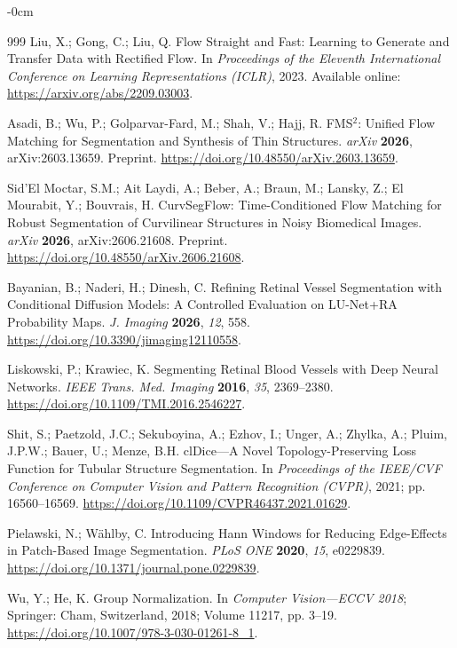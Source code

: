 \documentclass[jimaging,article,submit,pdftex,moreauthors]{Definitions/mdpi}
\begin{document}
\begin{adjustwidth}{-\extralength}{0cm}
\begin{thebibliography}{999}
Liu, X.; Gong, C.; Liu, Q.
Flow Straight and Fast: Learning to Generate and Transfer Data with Rectified Flow.
In \textit{Proceedings of the Eleventh International Conference on Learning Representations (ICLR)}, 2023.
Available online: \url{https://arxiv.org/abs/2209.03003}.

Asadi, B.; Wu, P.; Golparvar-Fard, M.; Shah, V.; Hajj, R.
FMS$^2$: Unified Flow Matching for Segmentation and Synthesis of Thin Structures.
\textit{arXiv} \textbf{2026}, arXiv:2603.13659. Preprint.
\url{https://doi.org/10.48550/arXiv.2603.13659}.

Sid'El Moctar, S.M.; Ait Laydi, A.; Beber, A.; Braun, M.; Lansky, Z.; El Mourabit, Y.; Bouvrais, H.
CurvSegFlow: Time-Conditioned Flow Matching for Robust Segmentation of Curvilinear Structures in Noisy Biomedical Images.
\textit{arXiv} \textbf{2026}, arXiv:2606.21608. Preprint.
\url{https://doi.org/10.48550/arXiv.2606.21608}.

Bayanian, B.; Naderi, H.; Dinesh, C.
Refining Retinal Vessel Segmentation with Conditional Diffusion Models: A Controlled Evaluation on LU-Net+RA Probability Maps.
\textit{J. Imaging} \textbf{2026}, \textit{12}, 558.
\url{https://doi.org/10.3390/jimaging12110558}.

Liskowski, P.; Krawiec, K.
Segmenting Retinal Blood Vessels with Deep Neural Networks.
\textit{IEEE Trans. Med. Imaging} \textbf{2016}, \textit{35}, 2369--2380.
\url{https://doi.org/10.1109/TMI.2016.2546227}.

Shit, S.; Paetzold, J.C.; Sekuboyina, A.; Ezhov, I.; Unger, A.; Zhylka, A.; Pluim, J.P.W.; Bauer, U.; Menze, B.H.
clDice---A Novel Topology-Preserving Loss Function for Tubular Structure Segmentation.
In \textit{Proceedings of the IEEE/CVF Conference on Computer Vision and Pattern Recognition (CVPR)}, 2021; pp. 16560--16569.
\url{https://doi.org/10.1109/CVPR46437.2021.01629}.

Pielawski, N.; W\"ahlby, C.
Introducing Hann Windows for Reducing Edge-Effects in Patch-Based Image Segmentation.
\textit{PLoS ONE} \textbf{2020}, \textit{15}, e0229839.
\url{https://doi.org/10.1371/journal.pone.0229839}.

Wu, Y.; He, K.
Group Normalization.
In \textit{Computer Vision---ECCV 2018}; Springer: Cham, Switzerland, 2018;
Volume 11217, pp. 3--19.
\url{https://doi.org/10.1007/978-3-030-01261-8_1}.


\end{thebibliography}
\end{adjustwidth}
\end{document}
